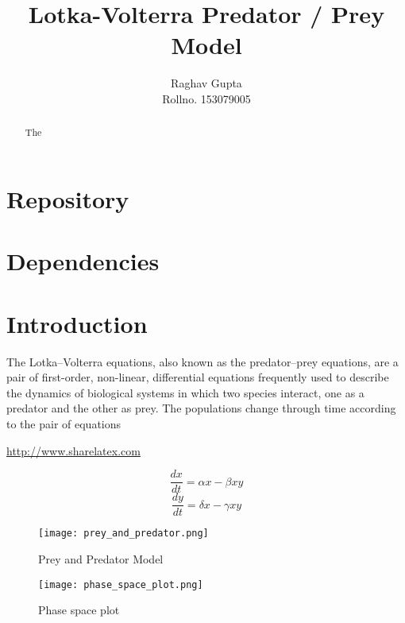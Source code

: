 \documentclass{article}
\title{Lotka-Volterra Predator / Prey Model}
\author{Raghav Gupta \\
		Rollno. 153079005}
\begin{document}


\maketitle
\newpage
\tableofcontents
\newpage
\listoffigures
\newpage

\begin{abstract}
The \clp \init
\end{abstract}

\newpage
\section{Repository}
\section{Dependencies}
\section{Introduction}
The Lotka–Volterra equations, also known as the predator–prey equations, are a pair of first-order, non-linear, differential equations frequently used to describe the dynamics of biological systems in which two species interact, one as a predator and the other as prey. The populations change through time according to the pair of equations\cite{greenwade93}

\url{http://www.sharelatex.com}

\begin{equation*}
\dfrac{dx}{dt} = \alpha x - \beta xy
\end{equation*}
\begin{equation*}
\dfrac{dy}{dt} = \delta x - \gamma xy
\end{equation*}

\begin{figure}[h]
\begin{center}
\texttt{[image: prey\_and\_predator.png]}
\caption{Prey and Predator Model}
\end{center}
\end{figure}

\begin{figure}[h]
\begin{center}
\texttt{[image: phase\_space\_plot.png]}
\caption{Phase space plot}
\end{center}
\end{figure}

\newpage


\end{document}
